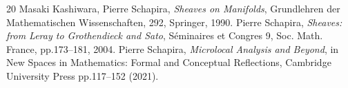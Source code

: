 \documentclass[uplatex,dvipdfmx,a4paper,10pt,draft]{jsarticle}
\theoremstyle{definition}
\numberwithin{equation}{section}
\theoremstyle{mystyle}
\begin{document}

\begin{thebibliography}{20} 
     Masaki Kashiwara, Pierre Schapira, 
      \textit{Sheaves on Manifolds}, 
      Grundlehren der Mathematischen Wissenschaften, 292, Springer, 1990.
     Pierre Schapira, 
      \textit{Sheaves: from Leray to Grothendieck and Sato}, 
      S\'eminaires et Congres 9, Soc. Math. France, pp.173--181, 2004.
     Pierre Schapira, 
      \textit{Microlocal Analysis and Beyond}, 
      in New Spaces in Mathematics: 
      Formal and Conceptual Reflections, 
      Cambridge University Press pp.117--152 (2021).
\end{thebibliography}
  
\end{document}
